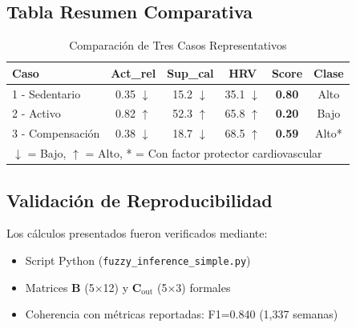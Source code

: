 \documentclass[12pt,letterpaper,twoside]{report}
\newcommand{\mat}[1]{\mathbf{#1}}
\begin{document}
\subsection{Tabla Resumen Comparativa}

\begin{table}[H]
\centering
\caption{Comparación de Tres Casos Representativos}
\label{tab:casos_comparativa}
\begin{tabular}{@{}lccccc@{}}
\toprule
\textbf{Caso} & \textbf{Act\_rel} & \textbf{Sup\_cal} & \textbf{HRV} & \textbf{Score} & \textbf{Clase} \\
\midrule
1 - Sedentario & 0.35 $\downarrow$ & 15.2 $\downarrow$ & 35.1 $\downarrow$ & \textbf{0.80} & Alto \\
2 - Activo     & 0.82 $\uparrow$ & 52.3 $\uparrow$ & 65.8 $\uparrow$ & \textbf{0.20} & Bajo \\
3 - Compensación & 0.38 $\downarrow$ & 18.7 $\downarrow$ & 68.5 $\uparrow$ & \textbf{0.59} & Alto* \\
\bottomrule
\multicolumn{6}{l}{\footnotesize $\downarrow$ = Bajo, $\uparrow$ = Alto, * = Con factor protector cardiovascular}
\end{tabular}
\end{table}

\subsection{Validación de Reproducibilidad}

Los cálculos presentados fueron verificados mediante:
\begin{itemize}[noitemsep]
\item Script Python (\texttt{fuzzy\_inference\_simple.py})
\item Matrices $\mat{B}$ (5$\times$12) y $\mat{C}_{\text{out}}$ (5$\times$3) formales
\item Coherencia con métricas reportadas: F1=0.840 (1,337 semanas)
\end{itemize}
\end{document}

